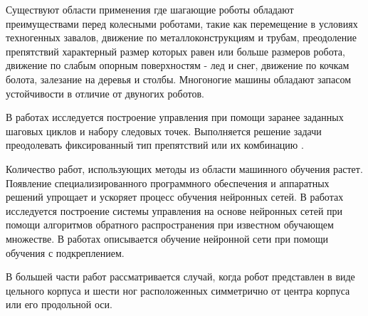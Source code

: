{\actuality}
Существуют области применения где шагающие роботы обладают преимуществами перед колесными роботами, такие как перемещение в условиях техногенных завалов, движение по металлоконструкциям и трубам, преодоление препятствий характерный размер которых равен или больше размеров робота, движение по слабым опорным поверхностям - лед и снег, движение по кочкам болота, залезание на деревья и столбы. Многоногие машины обладают запасом устойчивости в отличие от двуногих роботов.

В работах \todo{[]} исследуется построение управления при помощи заранее заданных шаговых циклов и набору следовых точек. Выполняется решение задачи преодолевать фиксированный тип препятствий или их комбинацию . 

Количество работ, использующих методы из области машинного обучения растет. Появление специализированного программного обеспечения и аппаратных решений упрощает и ускоряет процесс обучения нейронных сетей. В работах \todo{[]} исследуется построение системы управления на основе нейронных сетей при помощи алгоритмов обратного распространения при известном обучающем множестве. В работах \todo{[]} описывается обучение нейронной сети при помощи обучения с подкреплением.

В большей части работ \todo{[]} рассматривается случай, когда робот представлен в виде цельного корпуса и шести ног расположенных симметрично от центра корпуса или его продольной оси.



